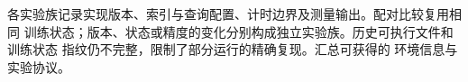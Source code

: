 各实验族记录实现版本、索引与查询配置、计时边界及测量输出。配对比较复用相同
训练状态；版本、状态或精度的变化分别构成独立实验族。历史可执行文件和训练状态
指纹仍不完整，限制了部分运行的精确复现。汇总可获得的
环境信息与实验协议。

